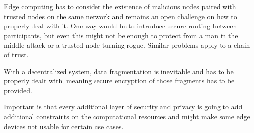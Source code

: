Edge computing has to consider the existence of malicious nodes paired with trusted nodes on the same network and remains an open challenge on how to properly deal with it.
One way would be to introduce secure routing between participants, but even this might not be enough to protect from a man in the middle attack or a trusted node turning rogue. Similar problems apply to a chain of trust.

With a decentralized system, data fragmentation is inevitable and has to be properly dealt with, meaning secure encryption of those fragments has to be provided.

Important is that every additional layer of security and privacy is going to add additional constraints on the computational resources and might make some edge devices not usable for certain use cases.

\\

\\
\\

\\


